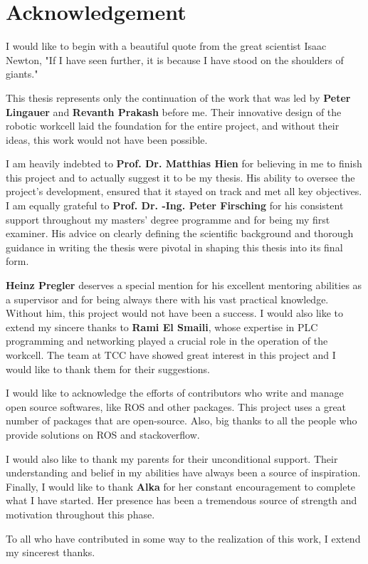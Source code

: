 \chapter*{Acknowledgement}

\vspace{1\baselineskip}

I would like to begin with a beautiful quote from the great scientist Isaac Newton,
"If I have seen further, it is because I have stood on the shoulders of giants."

\vspace{0.25\baselineskip}
This thesis represents only the continuation of the work that was led by \textbf{Peter Lingauer} and \textbf{Revanth Prakash} before me. Their innovative design of the robotic workcell laid the foundation for the entire project, and without their ideas, this work would not have been possible.
\vspace{0.25\baselineskip}

I am heavily indebted to \textbf{Prof. Dr. Matthias Hien} for believing in me to finish this project and to actually suggest it to be my thesis. His ability to oversee the project's development, ensured that it stayed on track and met all key objectives. I am equally grateful to \textbf{Prof. Dr. -Ing. Peter Firsching} for his consistent support throughout my masters' degree programme and for being my first examiner. His advice on clearly defining the scientific background and thorough guidance in writing the thesis were pivotal in shaping this thesis into its final form.
\vspace{0.25\baselineskip}

\textbf{Heinz Pregler} deserves a special mention for his excellent mentoring abilities as a supervisor and for being always there with his vast practical knowledge. Without him, this project would not have been a success. I would also like to extend my sincere thanks to \textbf{Rami El Smaili}, whose expertise in PLC programming and networking played a crucial role in the operation of the workcell. The team at TCC have showed great interest in this project and I would like to thank them for their suggestions.
\vspace{0.25\baselineskip}

I would like to acknowledge the efforts of contributors who write and manage open source softwares, like ROS and other packages. This project uses a great number of packages that are open-source. Also, big thanks to all the people who provide solutions on ROS and stackoverflow. 
\vspace{0.25\baselineskip}

I would also like to thank my parents for their unconditional support. Their understanding and belief in my abilities have always been a source of inspiration.
Finally, I would like to thank \textbf{Alka} for her constant encouragement to complete what I have started. Her presence has been a tremendous source of strength and motivation throughout this phase.
\vspace{0.25\baselineskip}

To all who have contributed in some way to the realization of this work, I extend my sincerest thanks.